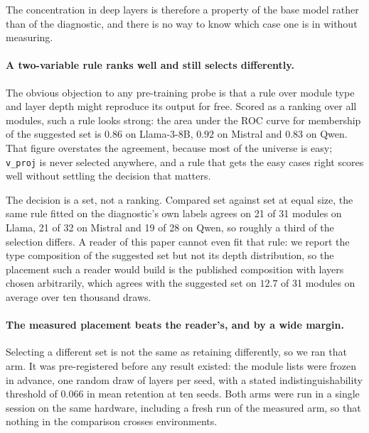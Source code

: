 \documentclass[11pt]{article}
\begin{document}
The concentration in deep layers is therefore a property of the base model
rather than of the diagnostic, and there is no way to know which case one is in
without measuring.

\paragraph{A two-variable rule ranks well and still selects differently.}
The obvious objection to any pre-training probe is that a rule over module type
and layer depth might reproduce its output for free. Scored as a ranking over
all modules, such a rule looks strong: the area under the ROC curve for
membership of the suggested set is $0.86$ on Llama-3-8B, $0.92$ on Mistral and
$0.83$ on Qwen. That figure overstates the agreement, because most of the
universe is easy; \texttt{v\_proj} is never selected anywhere, and a rule that
gets the easy cases right scores well without settling the decision that
matters.

The decision is a set, not a ranking. Compared set against set at equal size,
the same rule fitted on the diagnostic's own labels agrees on 21 of 31 modules
on Llama, 21 of 32 on Mistral and 19 of 28 on Qwen, so roughly a third of the
selection differs. A reader of this paper cannot even fit that rule: we report
the type composition of the suggested set but not its depth distribution, so the
placement such a reader would build is the published composition with layers
chosen arbitrarily, which agrees with the suggested set on $12.7$ of 31 modules
on average over ten thousand draws.

\paragraph{The measured placement beats the reader's, and by a wide margin.}
Selecting a different set is not the same as retaining differently, so we ran
that arm. It was pre-registered before any result existed: the module lists were
frozen in advance, one random draw of layers per seed, with a stated
indistinguishability threshold of $0.066$ in mean retention at ten seeds. Both
arms were run in a single session on the same hardware, including a fresh run of
the measured arm, so that nothing in the comparison crosses environments.
\end{document}
